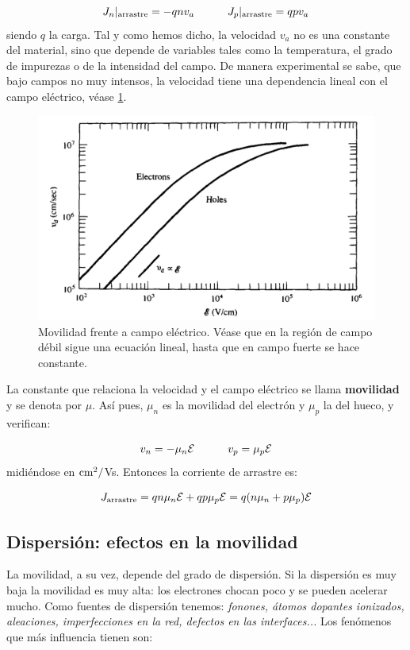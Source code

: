 \begin{equation}
	J_n|_{\text{arrastre}} = -qnv_a \quad \quad \quad 	J_p|_{\text{arrastre}} = qpv_a
\end{equation}
siendo $q$ la carga. Tal y como hemos dicho, la velocidad $v_a$ no es una constante del material, sino que depende de variables tales como la temperatura, el grado de impurezas o de la intensidad del campo. De manera experimental se sabe, que bajo campos no muy intensos, la velocidad tiene una dependencia lineal con el campo eléctrico, véase \cref{Fig:02-01}.

\begin{figure}[h!] \centering
	\includegraphics[width=0.9\linewidth]{Cuerpo/Ch_02/02_Movilidad_E.png}
	\caption{Movilidad frente a campo eléctrico. Véase que en la región de campo débil sigue una ecuación lineal, hasta que en campo fuerte se hace constante.}
	\label{Fig:02-01}
\end{figure}
La constante que relaciona la velocidad y el campo eléctrico se llama \textbf{movilidad} y se denota por $\mu$. Así pues, $\mu_n$ es la movilidad del electrón y $\mu_p$ la del hueco, y verifican:

\begin{equation}
	v_n = - \mu_n \mathcal{E} \quad \quad \quad v_p = \mu_p \mathcal{E}
\end{equation}
midiéndose en $\text{cm}^2/$Vs. Entonces la corriente de arrastre es:

\begin{equation}
	J_{\text{arrastre}} = qn\mu_n \mathcal{E} + qp\mu_p \mathcal{E} = q(n\mu_n+p\mu_p)\mathcal{E}
\end{equation}
\subsection{Dispersión: efectos en la movilidad}

La movilidad, a su vez, depende del grado de dispersión. Si la dispersión es muy baja la movilidad es muy alta: los electrones chocan poco y se pueden acelerar mucho. Como fuentes de dispersión tenemos: \textit{fonones, átomos dopantes ionizados, aleaciones, imperfecciones en la red, defectos en las interfaces...} Los fenómenos que más influencia tienen son:

